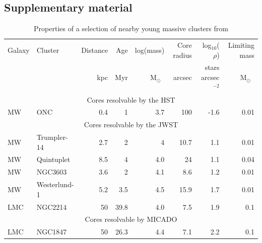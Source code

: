 \documentclass[referee]{aa}
\newcommand{\msun}{M$_\odot$~}
\newcommand{\h}[1]{$^{#1}$}
\begin{document}
\begin{appendix}

\section{Supplementary material}
\label{sec:appendix}

\begin{table}
    \centering
    \caption{Properties of a selection of nearby young massive clusters from \citet{portegies2010}}
    \label{tbl:pz10_selection}
    \begin{tabular}{l l r r r r r r}
        \hline\hline
        Galaxy & Cluster      & Distance & Age  & log(mass) & Core radius & log$_{10}$($\rho$)    & Limiting mass \\
              &              & kpc      & Myr  & \msun     & arcsec  & stars arcsec\h{-2} & \msun         \\
        \hline
        \multicolumn{8}{c}{Cores resolvable by the HST}                                                     \\
        \hline
        MW     & ONC          & 0.4      & 1    & 3.7       & 100     & -1.6           & 0.01          \\
        \hline
        \multicolumn{8}{c}{Cores resolvable by the JWST}                                                    \\
        \hline
        MW     & Trumpler-14  & 2.7      & 2    & 4         & 10.7    & 1.1            & 0.01          \\
        MW     & Quintuplet   & 8.5      & 4    & 4.0       & 24      & 1.1            & 0.04          \\
        MW     & NGC3603      & 3.6      & 2    & 4.1       & 8.6     & 1.2            & 0.01          \\
        MW     & Westerlund-1 & 5.2      & 3.5  & 4.5       & 15.9    & 1.7            & 0.01          \\
        LMC    & NGC2214      & 50       & 39.8 & 4.0       & 7.5     & 1.9            & 0.1           \\
        \hline
        \multicolumn{8}{c}{Cores resolvable by MICADO}                                                  \\
        \hline
        LMC    & NGC1847      & 50       & 26.3 & 4.4       & 7.1     & 2.2            & 0.1           \\

\end{tabular}
\end{table}
\end{appendix}
\end{document}
